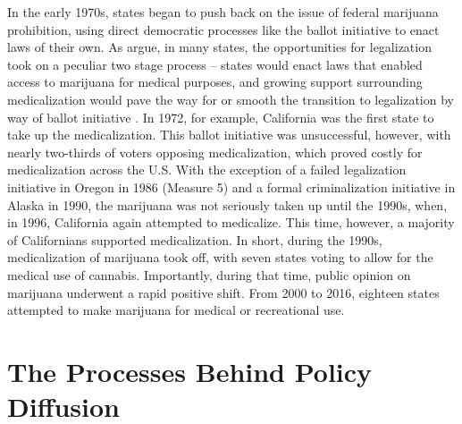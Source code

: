In the early 1970s, states began to push back on the issue of federal marijuana prohibition, using direct democratic processes like the ballot initiative to enact laws of their own. As \citet{newhart_and_dolphin_2018} argue, in many states, the opportunities for legalization took on a peculiar two stage process -- states would enact laws that enabled access to marijuana for medical purposes, and growing support surrounding medicalization would pave the way for or smooth the transition to legalization by way of ballot initiative \citep{kilmer_and_maccoun_2017}. In 1972, for example, California was the first state to take up the medicalization. This ballot initiative was unsuccessful, however, with nearly two-thirds of voters opposing medicalization, which proved costly for medicalization across the U.S. With the exception of a failed legalization initiative in Oregon in 1986 (Measure 5) and a formal criminalization initiative in Alaska in 1990, the marijuana was not seriously taken up until the 1990s, when, in 1996, California again attempted to medicalize. This time, however, a majority of Californians supported medicalization. In short, during the 1990s, medicalization of marijuana took off, with seven states voting to allow for the medical use of cannabis. Importantly, during that time, public opinion on marijuana underwent a rapid positive shift. From 2000 to 2016, eighteen states attempted to make marijuana for medical or recreational use.


\begin{center}
{\renewcommand\normalsize{\scriptsize}

}
\end{center}



  



\section{The Processes Behind Policy Diffusion}


